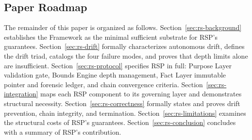 \subsection{Paper Roadmap}

The remainder of this paper is organized as follows. Section~\ref{sec:rs-background} establishes the \bxthree Framework as the minimal sufficient substrate for RSP's guarantees. Section~\ref{sec:rs-drift} formally characterizes autonomous drift, defines the drift triad, catalogs the four failure modes, and proves that depth limits alone are insufficient. Section~\ref{sec:rs-protocol} specifies RSP in full: Purpose Layer validation gate, Bounds Engine depth management, Fact Layer immutable pointer and forensic ledger, and chain convergence criteria. Section~\ref{sec:rs-integration} maps each RSP component to its governing \bxthree layer and demonstrates structural necessity. Section~\ref{sec:rs-correctness} formally states and proves drift prevention, chain integrity, and termination. Section~\ref{sec:rs-limitations} examines the structural costs of RSP's guarantees. Section~\ref{sec:rs-conclusion} concludes with a summary of RSP's contribution.
